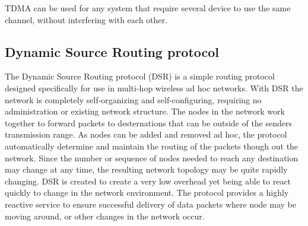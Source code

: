 TDMA can be used for any system that require several device to use the same channel, without interfering with each other.





\subsection{Dynamic Source Routing protocol}
The Dynamic Source Routing protocol (DSR) is a simple routing protocol designed specifically for use in multi-hop wireless ad hoc networks.
With DSR the network is completely self-organizing and self-configuring, requiring no administration or existing network structure.
The nodes in the network work together to forward packets to desternations that can be outside of the senders transmission range.
As nodes can be added and removed ad hoc, the protocol automatically determine and maintain the routing of the packets though out the network.
Since the number or sequence of nodes needed to reach any destination may change at any time, the resulting network topology may be quite rapidly changing.
DSR is created to create a very low overhead yet being able to react quickly to change in the network environment.
The protocol provides a highly reactive service to ensure successful delivery of data packets where node may be moving around, or other changes in the network occur\cite{DSR}. 


